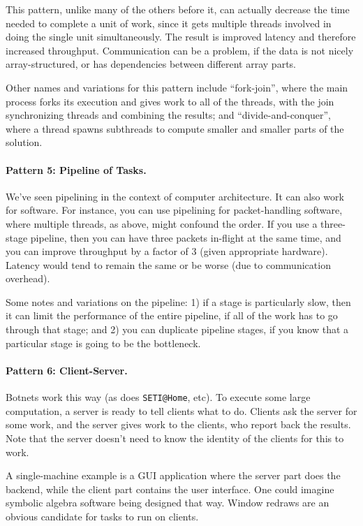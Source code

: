 \documentclass[a4paper]{report}
\begin{document}
This pattern, unlike many of the others before it, can actually
decrease the time needed to complete a unit of work, since it gets
multiple threads involved in doing the single unit simultaneously.
The result is improved latency and therefore increased throughput.
Communication can be a problem, if the data is not nicely
array-structured, or has dependencies between different array parts.

Other names and variations for this pattern include ``fork-join'',
where the main process forks its execution and gives work to all of
the threads, with the join synchronizing threads and combining the
results; and ``divide-and-conquer'', where a thread spawns subthreads
to compute smaller and smaller parts of the solution.

\paragraph{Pattern 5: Pipeline of Tasks.} We've seen pipelining in the context of
computer architecture. It can also work for software. For instance,
you can use pipelining for packet-handling software, where multiple
threads, as above, might confound the order. If you use a three-stage
pipeline, then you can have three packets in-flight at the same time,
and you can improve throughput by a factor of 3 (given appropriate
hardware).  Latency would tend to remain the same or be worse (due to
communication overhead).

Some notes and variations on the pipeline: 1) if a stage is
particularly slow, then it can limit the performance of the entire
pipeline, if all of the work has to go through that stage; and 2) you
can duplicate pipeline stages, if you know that a particular stage is
going to be the bottleneck.

\paragraph{Pattern 6: Client-Server.} Botnets work this way (as does \verb+SETI@Home+,
etc). To execute some large computation, a server is ready to tell
clients what to do.  Clients ask the server for some work, and the
server gives work to the clients, who report back the results. Note
that the server doesn't need to know the identity of the clients for
this to work.

A single-machine example is a GUI application where the server part
does the backend, while the client part contains the user interface.
One could imagine symbolic algebra software being designed that way.
Window redraws are an obvious candidate for tasks to run on clients.
\end{document}
